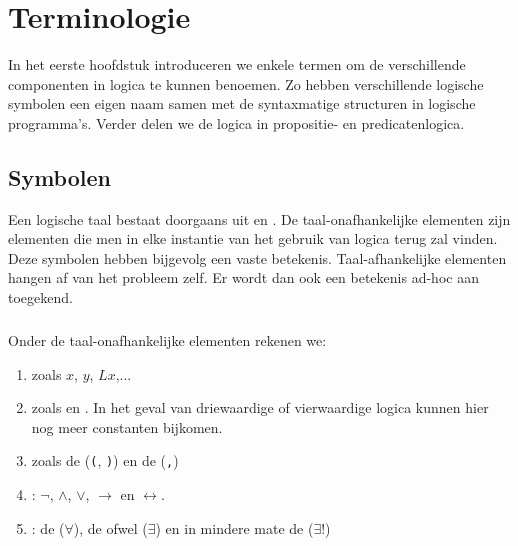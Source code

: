 \chapter{Terminologie}
In het eerste hoofdstuk introduceren we enkele termen om de verschillende componenten in logica te kunnen benoemen. Zo hebben verschillende logische symbolen een eigen naam samen met de syntaxmatige structuren in logische programma's. Verder delen we de logica in propositie- en predicatenlogica.
\section{Symbolen}
Een logische taal bestaat doorgaans uit  en . De taal-onafhankelijke elementen zijn elementen die men in elke instantie van het gebruik van logica terug zal vinden. Deze symbolen hebben bijgevolg een vaste betekenis. Taal-afhankelijke elementen hangen af van het probleem zelf. Er wordt dan ook een betekenis ad-hoc aan toegekend.
\paragraph{}
Onder de taal-onafhankelijke elementen rekenen we:
\begin{enumerate}
 \item {} zoals $x$, $y$, $Lx$,...
 \item {} zoals \xtrue{} en \xfalse{}. In het geval van driewaardige of vierwaardige logica kunnen hier nog meer constanten bijkomen.
 \item {} zoals de  (\verb+(+, \verb+)+) en de  (\verb+,+)
 \item {}: $\neg$, $\wedge$, $\vee$, $\rightarrow$ en $\leftrightarrow$.
 \item {}: de  ($\forall$), de  ofwel  ($\exists$) en in mindere mate de  ($\exists!$)
\end{enumerate}
